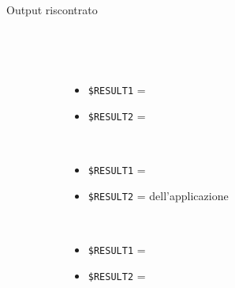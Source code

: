 \documentclass[../../SperimentazioniPratiche.tex]{subfiles}
\begin{document}
\begin{tcolorbox}[fonttitle=\bfseries, 
								adjusted title={\Large Prova 1C.1}, 
								breakable, 
								sharp corners=south,
								colback=white, 
								colframe=white!60!black]
\begin{description}
        			\item[Output riscontrato] \ \par
        				\begin{description}
        				
        					\item[\dispositivoA] \ \par
        					\begin{itemize}
        						\item \verb|$RESULT1| = \ok
        						\item \verb|$RESULT2| = \ok
        					\end{itemize}      					
        					
        					\item[\dispositivoB] \ \par
        					\begin{itemize}
        						\item \verb|$RESULT1| = \ok
        						\item \verb|$RESULT2| = \ok dell'applicazione
        					\end{itemize}
        					
        					\item[\dispositivoC] \ \par
        					\begin{itemize}
        						\item \verb|$RESULT1| = \ok
        						\item \verb|$RESULT2| = \ok
        					\end{itemize}
        					
        				\end{description}
        				
				\end{description}  
				
			\end{tcolorbox}
			
	\newpage
	\paragraph*{}
	\label{2Prova1C.2}
			
\end{document}
